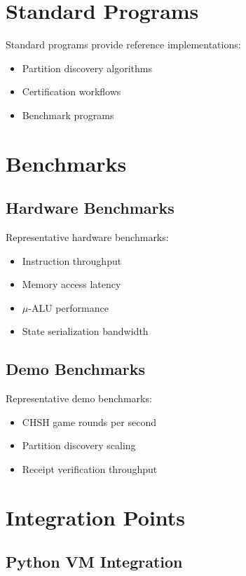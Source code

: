 \section{Standard Programs}

Standard programs provide reference implementations:
\begin{itemize}
    \item Partition discovery algorithms
    \item Certification workflows
    \item Benchmark programs
\end{itemize}

\section{Benchmarks}

\subsection{Hardware Benchmarks}

Representative hardware benchmarks:
\begin{itemize}
    \item Instruction throughput
    \item Memory access latency
    \item $\mu$-ALU performance
    \item State serialization bandwidth
\end{itemize}

\subsection{Demo Benchmarks}

Representative demo benchmarks:
\begin{itemize}
    \item CHSH game rounds per second
    \item Partition discovery scaling
    \item Receipt verification throughput
\end{itemize}

\section{Integration Points}

\subsection{Python VM Integration}

